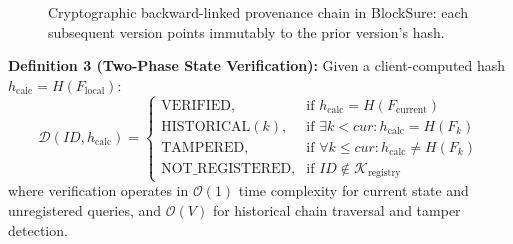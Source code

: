 \documentclass[10pt,conference,letterpaper]{IEEEtran}
\begin{document}
\begin{figure}[htbp]
\centering
{}
\caption{Cryptographic backward-linked provenance chain in BlockSure: each subsequent version points immutably to the prior version's hash.}
\label{fig:provenance_chain}
\end{figure}

\textbf{Definition 3 (Two-Phase State Verification):} Given a client-computed hash $h_{\mathrm{calc}} = H(F_{\mathrm{local}})$:
\begin{equation}
\mathcal{D}(\mathit{ID}, h_{\mathrm{calc}}) = 
\begin{cases}
\text{VERIFIED}, & \text{if } h_{\mathrm{calc}} = H(F_{\mathrm{current}}) \\
\text{HISTORICAL}(k), & \text{if } \exists k < \mathit{cur} : h_{\mathrm{calc}} = H(F_k) \\
\text{TAMPERED}, & \text{if } \forall k \le \mathit{cur} : h_{\mathrm{calc}} \neq H(F_k) \\
\text{NOT\_REGISTERED}, & \text{if } \mathit{ID} \notin \mathcal{K}_{\mathrm{registry}}
\end{cases}
\end{equation}
where verification operates in $\mathcal{O}(1)$ time complexity for current state and unregistered queries, and $\mathcal{O}(V)$ for historical chain traversal and tamper detection.
\end{document}
